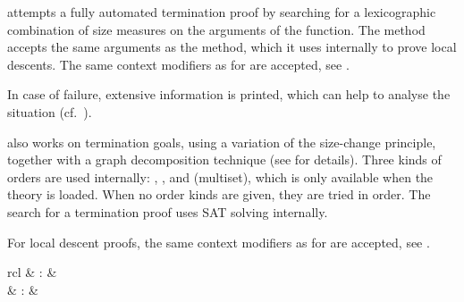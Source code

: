 \begin{isabellebody}
\begin{isamarkuptext}
\begin{description}
  \item \hyperlink{method.HOL.lexicographic-order}{\mbox{}} attempts a fully
  automated termination proof by searching for a lexicographic
  combination of size measures on the arguments of the function. The
  method accepts the same arguments as the \hyperlink{method.auto}{\mbox{}} method,
  which it uses internally to prove local descents.  The same context
  modifiers as for \hyperlink{method.auto}{\mbox{}} are accepted, see
  .

  In case of failure, extensive information is printed, which can help
  to analyse the situation (cf.\ \cite{isabelle-function}).

  \item \hyperlink{method.HOL.size-change}{\mbox{}} also works on termination goals,
  using a variation of the size-change principle, together with a
  graph decomposition technique (see \cite{krauss_phd} for details).
  Three kinds of orders are used internally: , ,
  and  (multiset), which is only available when the theory
   is loaded. When no order kinds are given, they are
  tried in order. The search for a termination proof uses SAT solving
  internally.

 For local descent proofs, the same context modifiers as for \hyperlink{method.auto}{\mbox{}} are accepted, see .

  \end{description}%
\end{isamarkuptext}%
\isamarkuptrue%
%
\isamarkuptrue%
%
\begin{isamarkuptext}%
\begin{matharray}{rcl}
    \hypertarget{command.HOL.partial-function}{\hyperlink{command.HOL.partial-function}{\mbox{}}} & : &  \\
    \hypertarget{attribute.HOL.partial-function-mono}{\hyperlink{attribute.HOL.partial-function-mono}{\mbox{}}} & : &  \\
  \end{matharray}


\end{isamarkuptext}
\end{isabellebody}

